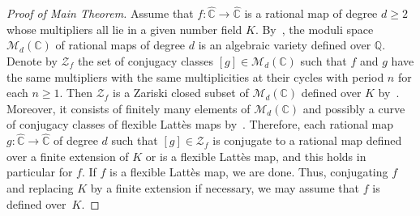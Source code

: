 \documentclass[JEP,XML,SOM,Unicode,published]{cedram}
\theoremstyle{plain}
\theoremstyle{definition}
\theoremstyle{remark}
\begin{document}
\begin{proof}[Proof of Main Theorem]
Assume that $f \colon \widehat{\mathbb{C}} \to \widehat{\mathbb{C}}$ is a rational map of degree $d \geq 2$ whose multipliers all lie in a given number field $K$. By~\cite[Th.\,2.1]{S1998}, the moduli space $\mathcal{M}_{d}(\mathbb{C})$ of rational maps of degree $d$ is an algebraic variety defined over $\mathbb{Q}$. Denote by $\mathcal{Z}_{f}$ the set of conjugacy classes $[g] \in \mathcal{M}_{d}(\mathbb{C})$ such that $f$ and $g$ have the same multipliers with the same multiplicities at their cycles with period $n$ for each $n \geq 1$. Then $\mathcal{Z}_{f}$ is a Zariski closed subset of $\mathcal{M}_{d}(\mathbb{C})$ defined over $K$ by~\cite[Th.\,4.5]{S1998}. Moreover, it consists of finitely many elements of $\mathcal{M}_{d}(\mathbb{C})$ and possibly a curve of conjugacy classes of flexible Lattès maps by~\cite[Cor.\,2.3]{MM1987}. Therefore, each rational map $g \colon \widehat{\mathbb{C}} \to \widehat{\mathbb{C}}$ of degree $d$ such that $[g] \in \mathcal{Z}_{f}$ is conjugate to a rational map defined over a finite extension of $K$ or is a flexible Lattès map, and this holds in particular for $f$. If $f$ is a flexible Lattès map, we are done. Thus, conjugating $f$ and replacing $K$ by a finite extension if necessary, we may assume that $f$ is defined over~$K$.


\end{proof}
\end{document}
